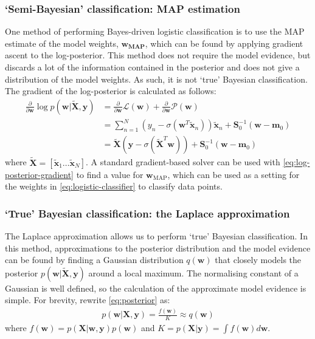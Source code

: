 \documentclass[a4paper]{article}
\begin{document}
    \subsubsection{`Semi-Bayesian' classification: MAP estimation}
    One method of performing Bayes-driven logistic classification is to use the MAP estimate of the model weights, $\bm{w_\text{MAP}}$, which can be found by applying gradient ascent to the log-posterior.
    This method does not require the model evidence, but discards a lot of the information contained in the posterior and does not give a distribution of the model weights.
    As such, it is not `true' Bayesian classification.
    The gradient of the log-posterior is calculated as follows:
    \begin{align}
        \frac{\partial}{\partial \bm{w}} \log p(\bm{w} | \tilde{\bm{X}}, \bm{y}) &= \frac{\partial}{\partial \bm{w}} \mathcal{L}(\bm{w}) + \frac{\partial}{\partial \bm{w}} \mathcal{P}(\bm{w}) \nonumber \\
        &= \sum_{n=1}^{N} \left(y_n - \sigma(\bm{w}^T \tilde{\bm{x}}_n) \right)  \tilde{\bm{x}}_n  + \bm{S}_0^{-1}(\bm{w} - \bm{m}_0) \nonumber \\
        &= \tilde{\bm{X}} (\textbf{y} - \sigma(\tilde{\bm{X}}^T \bm{w})) +  \bm{S}_0^{-1}(\bm{w} - \bm{m}_0)
        \label{eq:log-posterior-gradient}
    \end{align}
    where $\tilde{\bm{X}} = [\tilde{\bm{x}}_1 \dots \tilde{\bm{x}}_N]$.
    A standard gradient-based solver can be used with \autoref{eq:log-posterior-gradient} to find a value for $\bm{w}_\text{MAP}$, which can be used as a setting for the weights in \autoref{eq:logistic-classifier} to classify data points.

    \subsubsection{`True' Bayesian classification: the Laplace approximation}
    The Laplace approximation allows us to perform `true' Bayesian classification.
    In this method, approximations to the posterior distribution and the model evidence can be found by finding a Gaussian distribution $q(\bm{w})$ that closely models the posterior $p(\bm{w} | \tilde{\bm{X}}, \bm{y})$ around a local maximum.
    The normalising constant of a Gaussian is well defined, so the calculation of the approximate model evidence is simple.
    For brevity, rewrite \autoref{eq:posterior} as:
    \begin{align}
        p(\bm{w} | \bm{X}, \bm{y}) = \frac{f(\bm{w})}{K} \approx q(\bm{w}) \nonumber
    \end{align}
    where $f(\bm{w}) = p(\bm{X} | \bm{w}, \bm{y}) p(\bm{w})$ and $K = p(\bm{X} | \bm{y}) = \int f(\bm{w}) d\bm{w}$.
\end{document}
